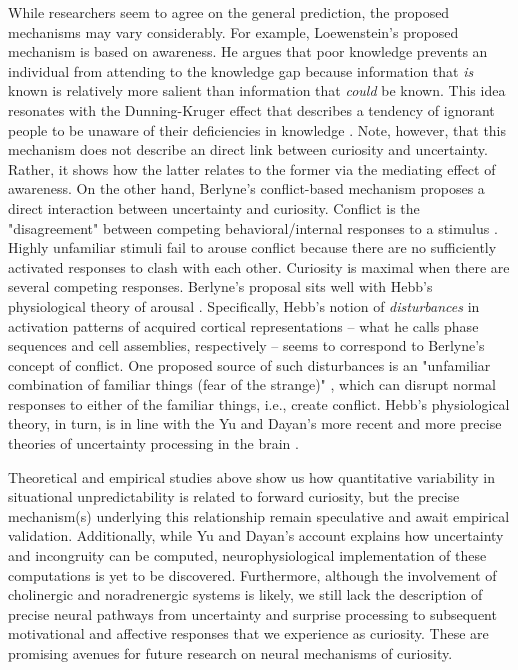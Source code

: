 While researchers seem to agree on the general prediction, the proposed mechanisms may vary considerably. For example, Loewenstein's \cite{loewenstein_psychology_1994} proposed mechanism is based on awareness. He argues that poor knowledge prevents an individual from attending to the knowledge gap because information that \emph{is} known is relatively more salient than information that \emph{could} be known. This idea resonates with the Dunning-Kruger effect that describes a tendency of ignorant people to be unaware of their deficiencies in knowledge \cite{dunning_chapter_2011}. Note, however, that this mechanism does not describe an direct link between curiosity and uncertainty. Rather, it shows how the latter relates to the former via the mediating effect of awareness. On the other hand, Berlyne's \cite{berlyne_theory_1954} conflict-based mechanism proposes a direct interaction between uncertainty and curiosity. Conflict is the "disagreement" between competing behavioral/internal responses to a stimulus \cite{berlyne_theory_1954,berlyne_uncertainty_1957}. Highly unfamiliar stimuli fail to arouse conflict because there are no sufficiently activated responses to clash with each other. Curiosity is maximal when there are several competing responses. Berlyne's proposal sits well with Hebb's physiological theory of arousal \cite{hebb_drives_1955}. Specifically, Hebb's notion of \emph{disturbances} in activation patterns of acquired cortical representations -- what he calls phase sequences and cell assemblies, respectively \cite{hebb_organization_2002} -- seems to correspond to Berlyne's concept of conflict. One proposed source of such disturbances is an "unfamiliar combination of familiar things (fear of the strange)" \cite[][, p. 250]{hebb_organization_2002}, which can disrupt normal responses to either of the familiar things, i.e., create conflict. Hebb's physiological theory, in turn, is in line with the Yu and Dayan's more recent and more precise theories of uncertainty processing in the brain \cite{yu_expected_2003,yu_uncertainty_2005}.

Theoretical and empirical studies above show us how quantitative variability in situational unpredictability is related to forward curiosity, but the precise mechanism(s) underlying this relationship remain speculative and await empirical validation. Additionally, while Yu and Dayan's account explains how uncertainty and incongruity can be computed, neurophysiological implementation of these computations is yet to be discovered. Furthermore, although the involvement of cholinergic and noradrenergic systems is likely, we still lack the description of precise neural pathways from uncertainty and surprise processing to subsequent motivational and affective responses that we experience as curiosity. These are promising avenues for future research on neural mechanisms of curiosity.

